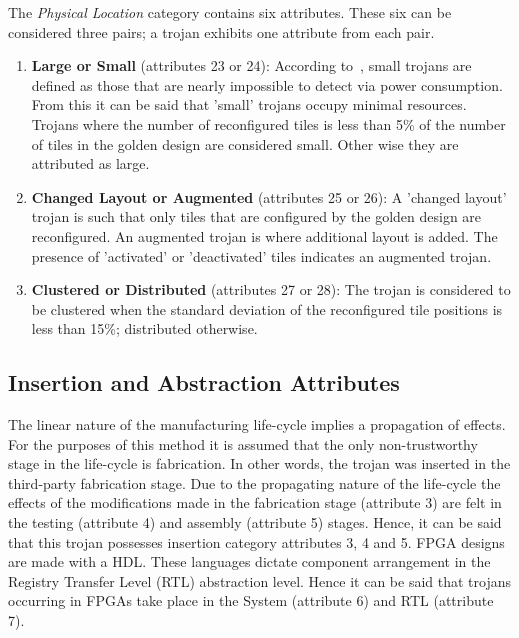 \documentclass[journal, hidelinks]{IEEEtran}
\begin{document}
The \textit{Physical Location} category contains six attributes.
These six can be considered three pairs; a trojan exhibits one attribute from each pair. 
\begin{enumerate}
	\item \textbf{Large or Small} (attributes 23 or 24): According to~\cite{samerAttribute}, small trojans are defined as those that are nearly impossible to detect via power consumption. From this it can be said that 'small' trojans occupy minimal resources. Trojans where the number of reconfigured tiles is less than 5\% of the number of tiles in the golden design are considered small. Other wise they are attributed as large.
	\item \textbf{Changed Layout or Augmented} (attributes 25 or 26): A 'changed layout' trojan is such that only tiles that are configured by the golden design are reconfigured. An augmented trojan is where additional layout is added. The presence of 'activated' or 'deactivated' tiles indicates an augmented trojan. 
	\item \textbf{Clustered or Distributed} (attributes 27 or 28): The trojan is considered to be clustered when the standard deviation of the reconfigured tile positions is less than 15\%; distributed otherwise.
\end{enumerate}
\subsection{Insertion and Abstraction Attributes}
The linear nature of the manufacturing life-cycle implies a propagation of effects.
For the purposes of this method it is assumed that the only non-trustworthy stage in the life-cycle is fabrication.
In other words, the trojan was inserted in the third-party fabrication stage.
Due to the propagating nature of the life-cycle the effects of the modifications made in the fabrication stage (attribute 3) are felt in the testing (attribute 4) and assembly (attribute 5) stages.
Hence, it can be said that this trojan possesses insertion category attributes 3, 4 and 5.
FPGA designs are made with a HDL.
These languages dictate component arrangement in the Registry Transfer Level (RTL) abstraction level.
Hence it can be said that trojans occurring in FPGAs take place in the System (attribute 6) and RTL (attribute 7).
\end{document}
